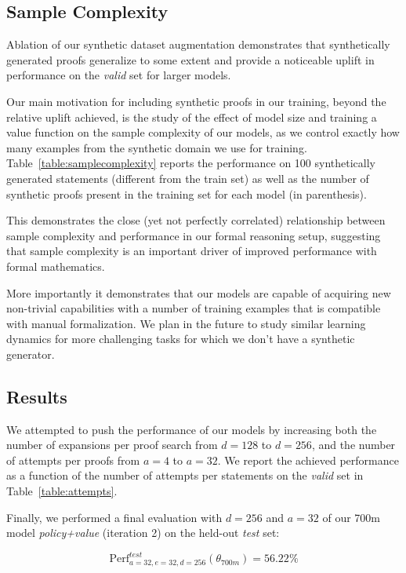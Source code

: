 \subsection{Sample Complexity}
\label{section:samplecomplexity}

Ablation of our synthetic dataset augmentation demonstrates that synthetically generated proofs generalize to some extent and provide a noticeable uplift in performance on the \textit{valid} set for larger models.

Our main motivation for including synthetic proofs in our training, beyond the relative uplift achieved, is the study of the effect of model size and training a value function on the sample complexity of our models, as we control exactly how many examples from the synthetic domain we use for training. Table~\ref{table:samplecomplexity} reports the performance on 100 synthetically generated statements (different from the train set) as well as the number of synthetic proofs present in the training set for each model (in parenthesis).

This demonstrates the close (yet not perfectly correlated) relationship between sample complexity and performance in our formal reasoning setup, suggesting that sample complexity is an important driver of improved performance with formal mathematics.

More importantly it demonstrates that our models are capable of acquiring new non-trivial capabilities with a number of training examples that is compatible with manual formalization. We plan in the future to study similar learning dynamics for more challenging tasks for which we don't have a synthetic generator.

\subsection{Results}

We attempted to push the performance of our models by increasing both the number of expansions per proof search from $d=128$ to $d=256$, and the number of attempts per proofs from $a=4$ to $a=32$. We report the achieved performance as a function of the number of attempts per statements on the \textit{valid} set in Table~\ref{table:attempts}.

Finally, we performed a final evaluation with $d=256$ and $a=32$ of our 700m model \textit{policy+value} (iteration 2) on the held-out \textit{test} set:

$$
\text{Perf}_{a=32,e=32,d=256}^{\mathit{test}}(\theta_{\textit{700m}}) = 56.22\%
$$

